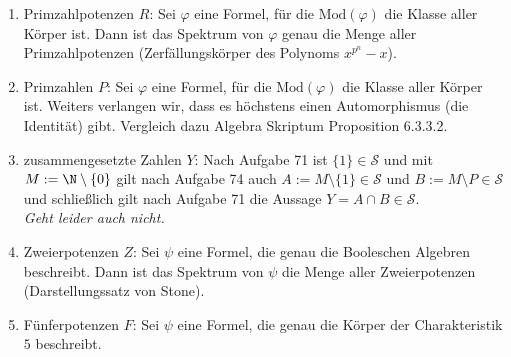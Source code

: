 \begin{solution}
\phantom{}

	\begin{enumerate}[label = \arabic*.]
		\item Primzahlpotenzen $R$: Sei $\varphi$ eine Formel, für die $\mathrm{Mod}(\varphi)$ die Klasse aller Körper ist.
		Dann ist das Spektrum von $\varphi$ genau die Menge aller Primzahlpotenzen (Zerfällungskörper des Polynoms $x^{p^n}- x$).

		\item Primzahlen $P$: Sei $\varphi$ eine Formel, für die $\mathrm{Mod}(\varphi)$ die Klasse aller Körper ist. Weiters verlangen wir, dass es höchstens einen Automorphismus (die Identität) gibt. Vergleich dazu Algebra Skriptum Proposition 6.3.3.2.

		\item zusammengesetzte Zahlen $Y$: Nach Aufgabe 71 ist $\{1\} \in \mathscr{S}$ und mit $M := \N \setminus \{0\}$ gilt  nach Aufgabe 74 auch $A:= M \setminus \{1\} \in \mathscr{S}$ und $B := M \setminus P \in \mathscr{S}$ und schließlich gilt nach Aufgabe 71 die Aussage $Y = A \cap B \in \mathscr{S}$. \\
		\textit{Geht leider auch nicht.}

		\item Zweierpotenzen $Z$: Sei $\psi$ eine Formel, die genau die Booleschen Algebren beschreibt. Dann ist das Spektrum von $\psi$ die Menge aller Zweierpotenzen (Darstellungssatz von Stone).

		\item Fünferpotenzen $F$: Sei $\psi$ eine Formel, die genau die Körper der
		Charakteristik $5$ beschreibt.


\end{enumerate}
\end{solution}
